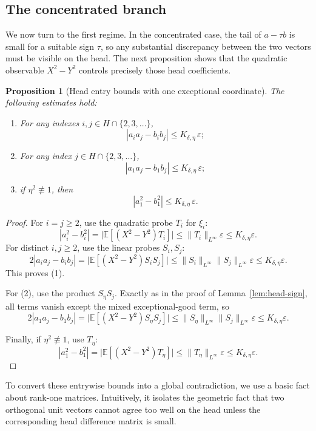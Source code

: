 \documentclass[11pt]{amsart}
\numberwithin{equation}{section}
\newtheorem{proposition}[theorem]{Proposition}
\theoremstyle{definition}
\theoremstyle{remark}
\newcommand{\E}{\mathbb E}
\newcommand{\eps}{\varepsilon}
\newcommand{\norm}[1]{\lVert #1 \rVert}
\begin{document}
\subsection{The concentrated branch}

We now turn to the first regime.  In the concentrated case, the tail of
$a-\tau b$ is small for a suitable sign $\tau$, so any substantial discrepancy
between the two vectors must be visible on the head.  The next proposition
shows that the quadratic observable $X^2-Y^2$ controls precisely those
head coefficients.

\begin{proposition}[Head entry bounds with one exceptional coordinate]
\label{prop:head-entry}
The following estimates hold:
\begin{enumerate}[label=\rm(\arabic*)]
\item For any indexes $i,j\in H\cap\{2,3,\dots\}$,
\[
|a_i a_j-b_i b_j|\le K_{\delta,\eta}\,\eps;
\]
\item For any index $j\in H\cap\{2,3,\dots\}$,
\[
|a_1a_j-b_1b_j|\le K_{\delta,\eta}\,\eps;
\]
\item if $\eta^2\not\equiv1$, then
\[
|a_1^2-b_1^2|\le K_{\delta,\eta}\,\eps.
\]
\end{enumerate}
\end{proposition}

\begin{proof}
For $i=j\ge2$, use the quadratic probe $T_i$ for $\xi_i$:
\[
|a_i^2-b_i^2|
=\bigl|\E[(X^2-Y^2)T_i]\bigr|
\le \norm{T_i}_{L^\infty}\eps
\le K_{\delta,\eta}\eps.
\]
For distinct $i,j\ge2$, use the linear probes $S_i,S_j$:
\[
2|a_i a_j-b_i b_j|
=\bigl|\E[(X^2-Y^2)S_iS_j]\bigr|
\le \norm{S_i}_{L^\infty}\norm{S_j}_{L^\infty}\eps
\le K_{\delta,\eta}\eps.
\]
This proves \rm(1).

For \rm(2), use the product $S_\eta S_j$.  Exactly as in the proof of
Lemma~\ref{lem:head-sign}, all terms vanish except the mixed
exceptional-good term, so
\[
2|a_1a_j-b_1b_j|
=\bigl|\E[(X^2-Y^2)S_\eta S_j]\bigr|
\le \norm{S_\eta}_{L^\infty}\norm{S_j}_{L^\infty}\eps
\le K_{\delta,\eta}\eps.
\]

Finally, if $\eta^2\not\equiv1$, use $T_\eta$:
\[
|a_1^2-b_1^2|
=\bigl|\E[(X^2-Y^2)T_\eta]\bigr|
\le \norm{T_\eta}_{L^\infty}\eps
\le K_{\delta,\eta}\eps.
\]
\end{proof}

To convert these entrywise bounds into a global contradiction, we use a basic fact about rank-one matrices. Intuitively,  it isolates the geometric fact that two orthogonal unit vectors cannot agree too well on the
head unless the corresponding head difference matrix is small.
\end{document}
